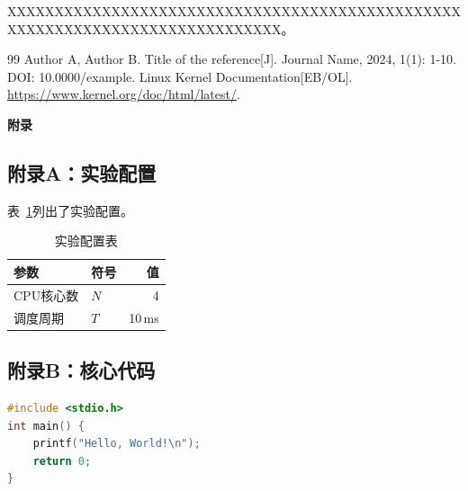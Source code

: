 \documentclass[a4paper, 12pt, twoside]{ctexart}
\newcommand{\centeredsectionstar}[1]{%
  \clearpage\phantomsection\vspace*{18pt}\begin{center}{\songti\bfseries\zihao{3}#1}\end{center}\vspace{18pt}}
\begin{document}
XXXXXXXXXXXXXXXXXXXXXXXXXXXXXXXXXXXXXXXXXXXXXXXXXXXXXXXXXXXXXXXXXXXXXXXXXXXXX。

\newpage
\begin{thebibliography}{99}
   Author A, Author B. Title of the reference[J].
    Journal Name, 2024, 1(1): 1-10. DOI: 10.0000/example.
   Linux Kernel Documentation[EB/OL].
    \url{https://www.kernel.org/doc/html/latest/}.
\end{thebibliography}

\appendix
\centeredsectionstar{附\quad 录}

\subsection*{附录A：实验配置}

表~\ref{tab:appendix-configs}列出了实验配置。

\begin{table}[H]
    \centering
    \caption{实验配置表}
    \label{tab:appendix-configs}
    \begin{tabular}{llr}
        \toprule
        \textbf{参数} & \textbf{符号} & \textbf{值} \\
        \midrule
        CPU核心数 & $N$ & 4 \\
        调度周期 & $T$ & 10\,ms \\
        \bottomrule
    \end{tabular}
\end{table}

\subsection*{附录B：核心代码}

\begin{lstlisting}[language=C, caption={示例代码}, label={lst:sample}]
#include <stdio.h>
int main() {
    printf("Hello, World!\n");
    return 0;
}
\end{lstlisting}
\end{document}
